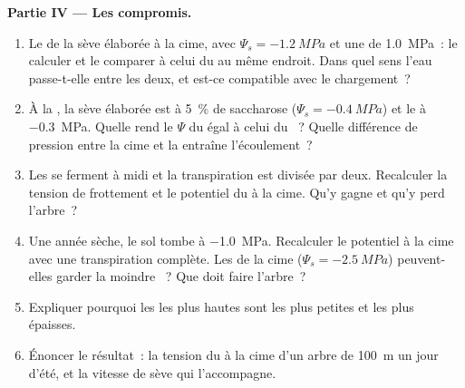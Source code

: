 \begin{problem}
\medskip
\noindent\textbf{Partie IV --- Les compromis.}
\begin{enumerate}[resume]
  \item Le  de la sève élaborée à la cime, avec
        $\Psi_s = \qty{-1.2}{MPa}$ et une  de \qty{1.0}{MPa}~:
        le calculer et le comparer à celui du  au même endroit.
        Dans quel sens l'eau passe-t-elle entre les deux, et est-ce
        compatible avec le chargement~?
  \item À la , la sève élaborée est à \qty{5}{\%} de saccharose ($\Psi_s =
        \qty{-0.4}{MPa}$) et le  à \qty{-0.3}{MPa}. Quelle
         rend le $\Psi$ du  égal à celui du ~?
        Quelle différence de pression entre la cime et la 
        entraîne l'écoulement~?
  \item Les  se ferment à midi et la transpiration est divisée
        par deux. Recalculer la tension de frottement et le potentiel
        du  à la cime. Qu'y gagne et qu'y perd l'arbre~?
  \item Une année sèche, le sol tombe à \qty{-1.0}{MPa}. Recalculer le
        potentiel à la cime avec une transpiration complète. Les
         de la cime ($\Psi_s = \qty{-2.5}{MPa}$) peuvent-elles
        garder la moindre ~? Que doit faire l'arbre~?
  \item Expliquer pourquoi les  les plus hautes sont les plus
        petites et les plus épaisses.
  \item Énoncer le résultat~: la tension du  à la cime d'un arbre
        de \qty{100}{m} un jour d'été, et la vitesse de sève qui
        l'accompagne.
\end{enumerate}
\end{problem}
